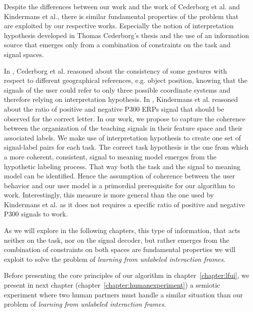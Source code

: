 Despite the differences between our work and the work of Cederborg et al. and Kindermans et al., there is similar fundamental properties of the problem that are exploited by our respective works. Especially the notion of interpretation hypothesis developed in Thomas Cederborg's thesis and the use of an information source that emerges only from a combination of constraints on the task and signal spaces. 

In \cite{cederborg2011imitating}, Cederborg et al. reasoned about the consistency of some gestures with respect to different geographical references, e.g. object position, knowing that the signals of the user could refer to only three possible coordinate systems and therefore relying on interpretation hypothesis. In \cite{Kindermans2012a,kindermans2014true}, Kindermans et al. reasoned about the ratio of positive and negative P300 ERPs signal that should be observed for the correct letter. In our work, we propose to capture the coherence between the organization of the teaching signals in their feature space and their associated labels. We make use of interpretation hypothesis to create one set of signal-label pairs for each task. The correct task hypothesis is the one from which a more coherent, consistent, signal to meaning model emerges from the hypothetic labeling process. That way both the task and the signal to meaning model can be identified. Hence the assumption of coherence between the user behavior and our user model is a primordial prerequisite for our algorithm to work. Interestingly, this measure is more general than the one used by Kindermans et al. as it does not requires a specific ratio of positive and negative P300 signals to work.

As we will explore in the following chapters, this type of information, that acts neither on the task, nor on the signal decoder, but rather emerges from the combination of constraints on both spaces are fundamental properties we will exploit to solve the problem of \emph{learning from unlabeled interaction frames}.

\transition

Before presenting the core principles of our algorithm in chapter~\ref{chapter:lfui}, we present in next chapter (chapter~\ref{chapter:humanexperiment}) a semiotic experiment where two human partners must handle a similar situation than our problem of \emph{learning from unlabeled interaction frames}.